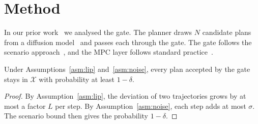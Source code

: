\section{Method}\label{sec:method}
In our prior work~\cite{campi2008exact} we analysed the gate. The planner draws $N$ candidate plans from a diffusion model~\cite{ho2020denoising} and passes
each through the gate. The gate follows the scenario approach~\cite{campi2008exact}, and the
MPC layer follows standard practice~\cite{rawlings2017model}.

\begin{theorem}\label{thm:main}
Under Assumptions~\ref{asm:lip} and~\ref{asm:noise}, every plan accepted by the gate stays in
$\mathcal{X}$ with probability at least $1-\delta$.
\end{theorem}

\begin{proof}
By Assumption~\ref{asm:lip}, the deviation of two trajectories grows by at most a factor $L$
per step. By Assumption~\ref{asm:noise}, each step adds at most $\sigma$. The scenario bound
then gives the probability $1-\delta$.
\end{proof}

